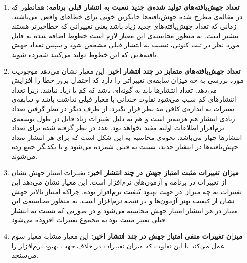 \begin{enumerate}
	\item  
	\textbf{
		تعداد جهش‌یافته‌های تولید شده‌ی جدید نسبت به انتشار قبلی برنامه: }همانطور که در مقاله‌ی \cite{just2014mutants} مطرح شده جهش‌یافته‌ها جایگزین خوبی برای خطاهای واقعی می‌باشند. زمانی که تعداد جهش‌یافته‌های جدید زیاد باشد یعنی تغییراتی که خطا‌خیز‌تر هستند بیشتر است. به منظور محاسبه‌ی این معیار لازم است خطوط اضافه شده به فایل مورد نظر در ثبت کنونی، نسبت به انتشار قبلی مشخص شود و سپس تعداد جهش یافته‌هایی که این خطوط تولید می‌کنند شمرده شوند. 
	\item 
	\textbf{
		تعداد جهش‌یافته‌های متمایز در چند انتشار اخیر:} این معیار نشان می‌دهد موجودیت مورد بررسی به چه میزان سابقه‌ی تغییراتی را دارد که احتمال بروز خطا را افزایش می‌دهد. تعداد انتشارها باید به گونه‌ای باشد که کم یا زیاد نباشد. زیرا تعداد انتشارهای کم سبب می‌شود تفاوت جندانی با معیار قبلی نداشت باشد و سابقه‌ی تغییرات به اندازه‌ی کافی مد نظر قرار نگیرد. از طرف دیگر در نظر گرفتن تعداد زیادی انتشار هم هزینه‌بر است و هم به دلیل تغییرات زیاد  فایل در طول توسعه‌ی نرم‌افزار اطلاعات اولیه مفید نخواهد بود. عدد در نظر گرفته شده برای تعداد انتشارها چهار می‌باشد. نحوه‌ی محاسبه به این شکل است که برای هر انتشار تعداد جهش‌یافته‌ها در انتشار جدید، نسبت به قبلی  شمرده می‌شود و با یکدیگر جمع زده  می‌شوند. 
	
	\item 
	\textbf{
		میزان تغییرات مثبت امتیاز جهش  در چند انتشار اخیر:}
	تغییرات امتیاز جهش نشان از تغییرات در برنامه و آزمون‌های نرم‌افزار است. این معیار نشان می‌دهد این تغییرات به چه میزان در جهت بهبود کیفیت نرم‌افزار بوده. چراکه امتیاز بالاتر جهش نشان از کیفیت بهتر آزمون‌ها و در نتیجه نرم‌افزار است.  به منظور محاسبه‌ی این معیار در هر انتشار امتیاز جهش محاسبه می‌شود و در صورتی که نسبت به انتشار قبلی تغییر مثبت  بود به مجموع تغییرات افزوده می‌شود. 
	\item 
	\textbf{
		میزان تغییرات منفی امتیاز جهش در چند انتشار اخیر:}
	این معیار مشابه معیار سوم عمل می‌کند با این تفاوت که میزان تغییرات در خلاف جهت بهبود نرم‌افزار را می‌سنجد. 	
	
\end{enumerate}


